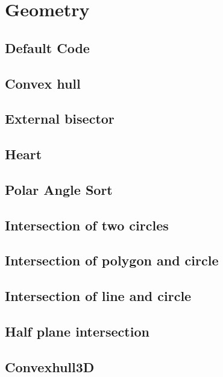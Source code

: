\section{Geometry}
\subsection{Default Code}

\subsection{Convex hull}

\subsection{External bisector}

\subsection{Heart}

\subsection{Polar Angle Sort}

\subsection{Intersection of two circles}

\subsection{Intersection of polygon and circle}

\subsection{Intersection of line and circle}

\subsection{Half plane intersection}

\subsection{Convexhull3D}

